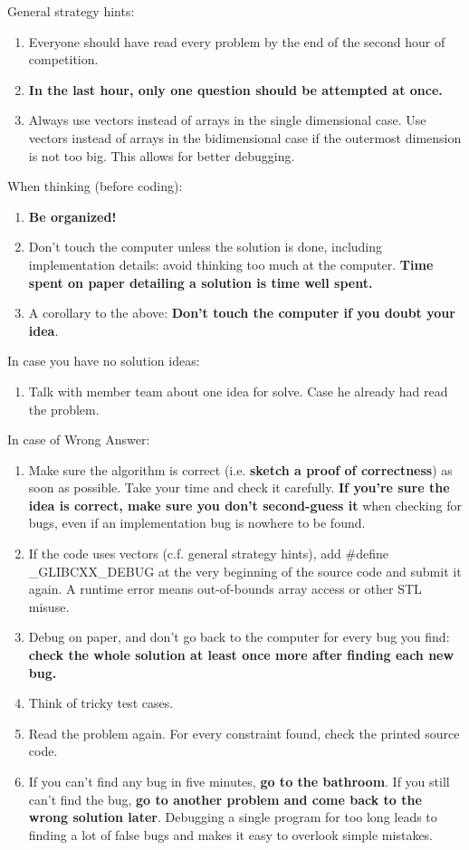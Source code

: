       General strategy hints:
      \begin{enumerate}
        \item Everyone should have read every problem by the end of the second hour of competition.
        \item \textbf{In the last hour, only one question should be attempted at once.}
        \item Always use vectors instead of arrays in the single dimensional case. Use vectors instead of arrays in the bidimensional case if the outermost dimension is not too big. This allows for better debugging.
      \end{enumerate}

      When thinking (before coding):
      \begin{enumerate}
        \item \textbf{Be organized!}
        \item Don't touch the computer unless the solution is done, including implementation details: avoid thinking too much at the computer. \textbf{Time spent on paper detailing a solution is time well spent.}
        \item A corollary to the above: \textbf{Don't touch the computer if you doubt your idea}.
      \end{enumerate}

      In case you have no solution ideas:
      \begin{enumerate}
        \item Talk with member team about one idea for solve. Case he already had read the problem.
      \end{enumerate}

      In case of Wrong Answer:
      \begin{enumerate}
        \item Make sure the algorithm is correct (i.e. \textbf{sketch a proof of correctness}) as soon as possible. Take your time and check it carefully. \textbf{If you're sure the idea is correct, make sure you don't second-guess it} when checking for bugs, even if an implementation bug is nowhere to be found.
        \item If the code uses vectors (c.f. general strategy hints), add \#define \_GLIBCXX\_DEBUG at the very beginning of the source code and submit it again. A runtime error means out-of-bounds array access or other STL misuse.
        \item Debug on paper, and don't go back to the computer for every bug you find: \textbf{check the whole solution at least once more after finding each new bug.}
        \item Think of tricky test cases.
        \item Read the problem again. For every constraint found, check the printed source code.
        \item If you can't find any bug in five minutes, \textbf{go to the bathroom}. If you still can't find the bug, \textbf{go to another problem and come back to the wrong solution later}. Debugging a single program for too long leads to finding a lot of false bugs and makes it easy to overlook simple mistakes.
      \end{enumerate}

